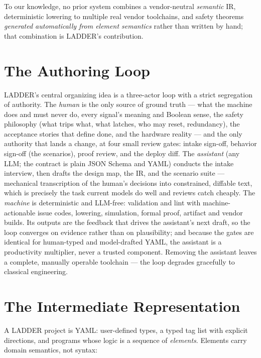 \documentclass[letterpaper]{jacow}
\begin{document}
To our knowledge, no prior system combines a vendor-neutral
\emph{semantic} IR, deterministic lowering to multiple real vendor
toolchains, and safety theorems \emph{generated automatically from
element semantics} rather than written by hand; that combination is
LADDER's contribution.

\section{The Authoring Loop}

LADDER's central organizing idea is a three-actor loop with a strict
segregation of authority. The \emph{human} is the only source of
ground truth --- what the machine does and must never do, every
signal's meaning and Boolean sense, the safety philosophy (what trips
what, what latches, who may reset, redundancy), the acceptance stories
that define done, and the hardware reality --- and the only authority
that lands a change, at four small review gates: intake sign-off,
behavior sign-off (the scenarios), proof review, and the deploy diff.
The \emph{assistant} (any LLM; the contract is plain JSON Schema and
YAML) conducts the intake interview, then drafts the design map, the
IR, and the scenario suite --- mechanical transcription of the human's
decisions into constrained, diffable text, which is precisely the task
current models do well and reviews catch cheaply. The \emph{machine} is
deterministic and LLM-free: validation and lint with machine-actionable
issue codes, lowering, simulation, formal proof, artifact and vendor
builds. Its outputs are the feedback that drives the assistant's next
draft, so the loop converges on evidence rather than on plausibility;
and because the gates are identical for human-typed and model-drafted
YAML, the assistant is a productivity multiplier, never a trusted
component. Removing the assistant leaves a complete, manually operable
toolchain --- the loop degrades gracefully to classical engineering.

\section{The Intermediate Representation}

A LADDER project is YAML: user-defined types, a typed tag list with
explicit directions, and programs whose logic is a sequence of
\emph{elements}. Elements carry domain semantics, not syntax:
\end{document}

